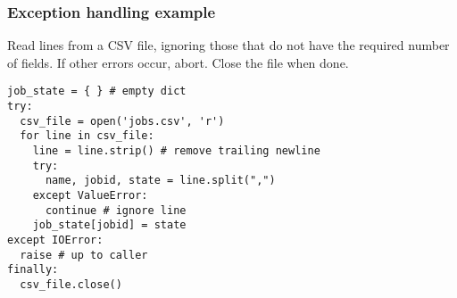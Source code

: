 \documentclass[english,serif,mathserif,xcolor=pdftex,dvipsnames,table]{beamer}
\begin{document}
\begin{frame}[fragile]
  \frametitle{Exception handling example}

Read lines from a CSV file, ignoring those that do not have the
required number of fields.  If other errors occur, abort. 
Close the file when done.
\begin{lstlisting}
job_state = { } # empty dict
try:
  csv_file = open('jobs.csv', 'r')
  for line in csv_file:
    line = line.strip() # remove trailing newline
    try:
      name, jobid, state = line.split(",")
    except ValueError:
      continue # ignore line
    job_state[jobid] = state
except IOError:
  raise # up to caller
finally:
  csv_file.close()
\end{lstlisting}
\end{frame}
\end{document}
